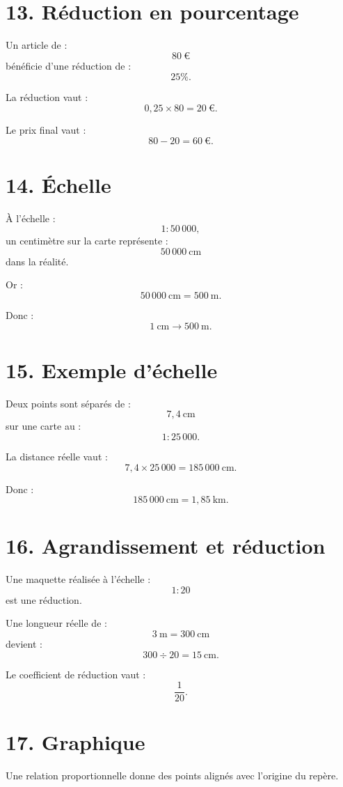 \section{13. Réduction en pourcentage}

Un article de :
\[
80\ \text{€}
\]
bénéficie d'une réduction de :
\[
25\%.
\]

La réduction vaut :
\[
0{,}25\times80=20\ \text{€}.
\]

Le prix final vaut :
\[
80-20=60\ \text{€}.
\]

\section{14. Échelle}

À l'échelle :
\[
1:50\,000,
\]
un centimètre sur la carte représente :
\[
50\,000\ \text{cm}
\]
dans la réalité.

Or :
\[
50\,000\ \text{cm}=500\ \text{m}.
\]

Donc :
\[
1\ \text{cm}\longrightarrow500\ \text{m}.
\]

\section{15. Exemple d'échelle}

Deux points sont séparés de :
\[
7{,}4\ \text{cm}
\]
sur une carte au :
\[
1:25\,000.
\]

La distance réelle vaut :
\[
7{,}4\times25\,000=185\,000\ \text{cm}.
\]

Donc :
\[
185\,000\ \text{cm}=1{,}85\ \text{km}.
\]

\section{16. Agrandissement et réduction}

Une maquette réalisée à l'échelle :
\[
1:20
\]
est une réduction.

Une longueur réelle de :
\[
3\ \text{m}=300\ \text{cm}
\]
devient :
\[
300\div20=15\ \text{cm}.
\]

Le coefficient de réduction vaut :
\[
\dfrac1{20}.
\]

\section{17. Graphique}

Une relation proportionnelle donne des points alignés avec l'origine du repère.


